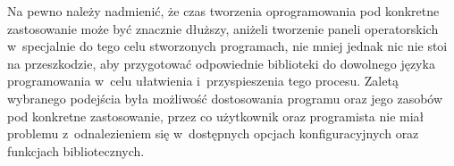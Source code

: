 Na pewno należy nadmienić, że czas tworzenia oprogramowania pod konkretne
zastosowanie może być znacznie dłuższy, aniżeli tworzenie paneli operatorskich
w~specjalnie do tego celu stworzonych programach, nie mniej jednak nic nie stoi
na przeszkodzie, aby przygotować odpowiednie biblioteki do dowolnego języka
programowania w~celu ułatwienia i~przyspieszenia tego procesu. Zaletą wybranego
podejścia była możliwość dostosowania programu oraz jego zasobów pod konkretne
zastosowanie, przez co użytkownik oraz programista nie miał problemu
z~odnalezieniem się w~dostępnych opcjach konfiguracyjnych oraz funkcjach
bibliotecznych.
